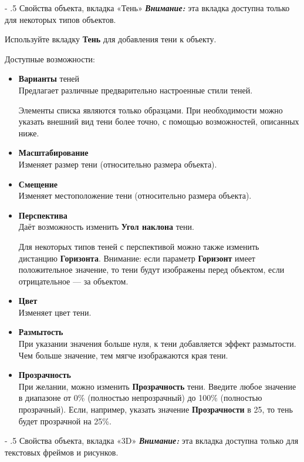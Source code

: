 \documentclass[a4paper,10pt]{article}
\makeatletter
\renewcommand\paragraph{%
   \@startsection{paragraph}{4}{0mm}%
      {-\baselineskip}%
      {.5\baselineskip}%
      {\normalfont\normalsize\bfseries}}
\makeatother
\begin{document}
\paragraph{Свойства объекта, вкладка «Тень»} 
\textbf{\textit{Внимание:}} эта вкладка доступна только для некоторых типов объектов.

Используйте вкладку \textbf{Тень} для добавления тени к объекту.

Доступные возможности:

\begin{itemize}
 \item \textbf{Варианты} теней\\
 Предлагает различные предварительно настроенные стили теней.
 
 Элементы списка являются только образцами. При необходимости можно указать внешний вид тени более точно, с помощью возможностей, описанных ниже.
 \item \textbf{Масштабирование}\\
 Изменяет размер тени (относительно размера объекта).
 \item \textbf{Смещение}\\
 Изменяет местоположение тени (относительно размера объекта).
 \item \textbf{Перспектива}\\
 Даёт возможность изменить \textbf{Угол наклона} тени.
 
 Для некоторых типов теней с перспективой можно также изменить дистанцию \textbf{Горизонта}. Внимание: если параметр \textbf{Горизонт} имеет положительное значение, то тени будут изображены перед объектом, если отрицательное --- за объектом.
 \item \textbf{Цвет}\\
 Изменяет цвет тени.
 \item \textbf{Размытость}\\
 При указании значения больше нуля, к тени добавляется эффект размытости. Чем больше значение, тем мягче изображаются края тени.
 \item \textbf{Прозрачность}\\
 При желании, можно изменить \textbf{Прозрачность} тени. Введите любое значение в диапазоне от 0\% (полностью непрозрачный) до 100\% (полностью прозрачный). Если, например, указать значение \textbf{Прозрачности} в 25, то тень будет прозрачной на 25\%.
\end{itemize}

\paragraph{Свойства объекта, вкладка «3D»}
\textbf{\textit{Внимание:}} эта вкладка доступна только для текстовых фреймов и рисунков.
\end{document}

